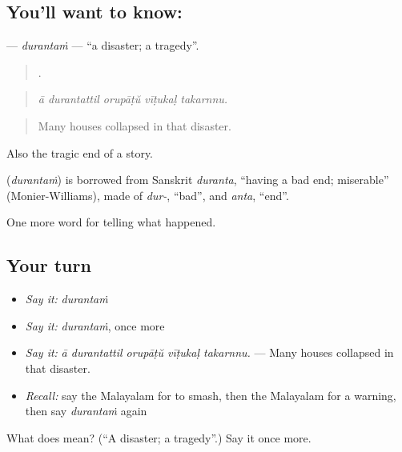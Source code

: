 \subsection*{You'll want to know: }
\textbf{} — \emph{durantaṁ} — \textquotedblleft{}a disaster; a tragedy\textquotedblright{}.

\begin{quote}
    .
\end{quote}

\begin{quote}
\emph{ā durantattil orupāṭŭ vīṭukaḷ takarnnu.}
\end{quote}

\begin{quote}
Many houses collapsed in that disaster.
\end{quote}

Also the tragic end of a story.

\begin{cousinweb}
\textbf{} (\emph{durantaṁ}) is borrowed from Sanskrit \emph{duranta}, \textquotedblleft{}having a bad end; miserable\textquotedblright{} (Monier-Williams), made of \emph{dur-}, \textquotedblleft{}bad\textquotedblright{}, and \emph{anta}, \textquotedblleft{}end\textquotedblright{}.
\end{cousinweb}

\begin{grammarlens}[title={What you've built}]
One more word for telling what happened.
\end{grammarlens}

\subsection*{Your turn}
\begin{itemize}
\raggedright
  \item \emph{Say it:} \emph{durantaṁ}
  \item \emph{Say it:} \emph{durantaṁ}, once more
  \item \emph{Say it:} \emph{ā durantattil orupāṭŭ vīṭukaḷ takarnnu.} — Many houses collapsed in that disaster.
  \item \emph{Recall:} say the Malayalam for to smash, then the Malayalam for a warning, then say \emph{durantaṁ} again
\end{itemize}

\begin{tcolorbox}[breakable,colback=teal!4,colframe=teal!35!black,title={Before you move on}]
What does  mean? (\textquotedblleft{}A disaster; a tragedy\textquotedblright{}.) Say it once more.
\end{tcolorbox}
